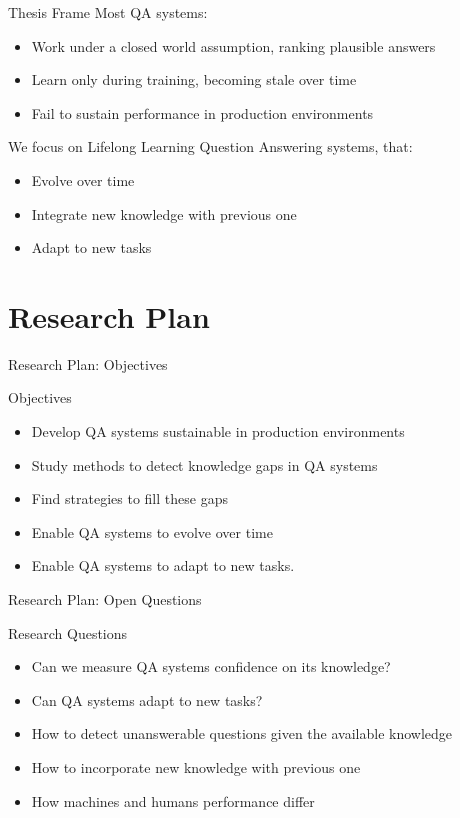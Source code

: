 \documentclass{beamer}
\begin{document}
\begin{frame}{Thesis Frame}
  Most QA systems:
  \begin{itemize}
    \item Work under a closed world assumption, ranking plausible answers
    \item Learn only during training, becoming stale over time
    \item Fail to sustain performance in production environments
  \end{itemize}
  We focus on Lifelong Learning Question Answering systems, that:
  \begin{itemize}
    \item Evolve over time
    \item Integrate new knowledge with previous one
    \item Adapt to new tasks
  \end{itemize}
\end{frame}

\section{Research Plan}
\begin{frame}{Research Plan: Objectives}
  \begin{alertblock}{Objectives}
    \begin{itemize}
      \item Develop QA systems sustainable in production environments
      \item Study methods to detect knowledge gaps in QA systems
      \item Find strategies to fill these gaps
      \item Enable QA systems to evolve over time
      \item Enable QA systems to adapt to new tasks.
    \end{itemize}
  \end{alertblock}
\end{frame}


\begin{frame}{Research Plan: Open Questions}
  \begin{alertblock}{Research Questions}
    \begin{itemize}
      \item Can we measure QA systems confidence on its knowledge?
      \item Can QA systems adapt to new tasks?
      \item How to detect unanswerable questions given the available knowledge
      \item How to incorporate new knowledge with previous one
      \item How machines and humans performance differ
    \end{itemize}
  \end{alertblock}
\end{frame}
\end{document}
